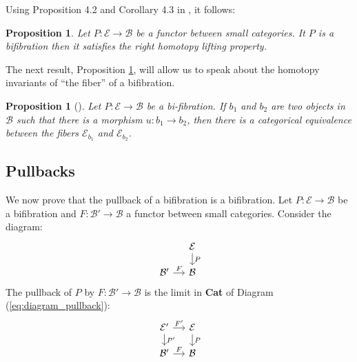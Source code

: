 \documentclass[12pt,reqno]{amsart}
\newtheorem{prop}[teo]{Proposition}
\theoremstyle{definition}
\newtheorem{defi}[teo]{Definition}
\theoremstyle{remark}
\numberwithin{figure}{section}%
\newcommand{\Ba}{\mathcal{B}}
\newcommand{\E}{\mathcal{E}}
\begin{document}
Using Proposition 4.2 and Corollary 4.3 in \cite{TANAKA}, it follows:

\begin{prop}\label{Lifting}
Let $P\colon \E \to \Ba$ be a functor between small categories. It $P$ is a bifibration then it satisfies the right homotopy lifting property. 
\end{prop}

The next result, Proposition \ref{EQUIVALE}, will allow us to speak about the homotopy invariants of ``the fiber'' of a bifibration.


\begin{prop}[{\cite[Proposition 4.4]{TANAKA}}]\label{EQUIVALE}%
Let $P\colon\E \rightarrow \Ba$ be a bi-fibration.  If $b_1$ and $b_2$ are two objects in $\Ba$ such that   there is a morphism $u\colon b_1 \to b_2$, then there is a categorical equivalence between the fibers  $\E_{b_1}$ and $\E_{b_2}$.
\end{prop}




\subsection{Pullbacks} We now prove that the pullback of a bifibration is a bifibration.
Let $P\colon \E \to \Ba$ be a bifibration and $F\colon \Ba'\to \Ba$ a functor between small categories. Consider the diagram:
 \begin{equation}\label{eq:diagram_pullback}
     \begin{tikzcd}[column sep=12pt, row sep=12pt] 
& \E \arrow[d, "P"] \\
\Ba' \arrow[r, "F"] & \Ba               
\end{tikzcd}
 \end{equation}
The pullback of $P$ by $F\colon \Ba'\to \Ba$ is the limit in \textbf{Cat} of Diagram (\ref{eq:diagram_pullback}):
\begin{equation*}
    \begin{tikzcd}[column sep=12pt, row sep=12pt] 
\E' \arrow[d, "P'"] \arrow[r, "F'"] & \E \arrow[d, "P"] \\
\Ba' \arrow[r, "F"]                  & \Ba               
\end{tikzcd}
\end{equation*}
\end{document}
